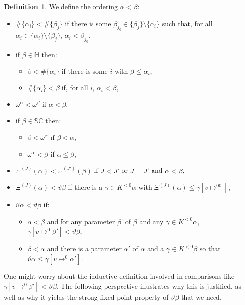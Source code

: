 \documentclass[11pt]{amsart}
\theoremstyle{definition}
\newtheorem{definition}[theorem]{Definition}
\begin{document}
\begin{definition}
  We define the ordering $\alpha<\beta$:
  \begin{itemize}
\item $\#\{\alpha_i\}<\#\{\beta_j\}$ if there is some $\beta_{j_0}\in\{\beta_j\}\setminus\{\alpha_i\}$ such that, for all $\alpha_i\in\{\alpha_i\}\setminus\{\beta_j\}$, $\alpha_i<\beta_{j_0}$,
\item if $\beta\in\mathbb{H}$ then:
  \begin{itemize}
  \item $\beta<\#\{\alpha_i\}$ if there is some $i$ with $\beta\leq\alpha_i$,
  \item $\#\{\alpha_i\}<\beta$ if, for all $i$, $\alpha_i<\beta$,
  \end{itemize}
\item $\omega^\alpha<\omega^\beta$ if $\alpha<\beta$,
\item if $\beta\in\mathbb{SC}$ then:
  \begin{itemize}
  \item $\beta<\omega^\alpha$ if $\beta<\alpha$,
  \item $\omega^\alpha<\beta$ if $\alpha\leq\beta$,
  \end{itemize}
\item $\Xi^{(J)}(\alpha)<\Xi^{(J')}(\beta)$ if $J<J'$ or $J=J'$ and $\alpha<\beta$,
\item $\Xi^{(J)}(\alpha)<\vartheta\beta$ if there is a $\gamma\in K^{<0}\alpha$ with $\Xi^{(J)}(\alpha)\leq\gamma[v\mapsto^00]$,
\item $\vartheta\alpha<\vartheta\beta$ if:
  \begin{itemize}
  \item $\alpha<\beta$ and for any parameter $\beta'$ of $\beta$ and any $\gamma\in K^{< 0}\alpha$, $\gamma[v\mapsto^{0}\beta']<\vartheta\beta$,
  \item $\beta<\alpha$ and there is a parameter $\alpha'$ of $\alpha$ and a $\gamma\in K^{<0}\beta$ so that $\vartheta\alpha\leq\gamma[v\mapsto^0\alpha']$.
  \end{itemize}
\end{itemize}
\end{definition}

One might worry about the inductive definition involved in comparisons like $\gamma[v\mapsto^{0}\beta']<\vartheta\beta$. The following perspective illustrates why this is justified, as well as why it yields the strong fixed point property of $\vartheta\beta$ that we need.
\end{document}
